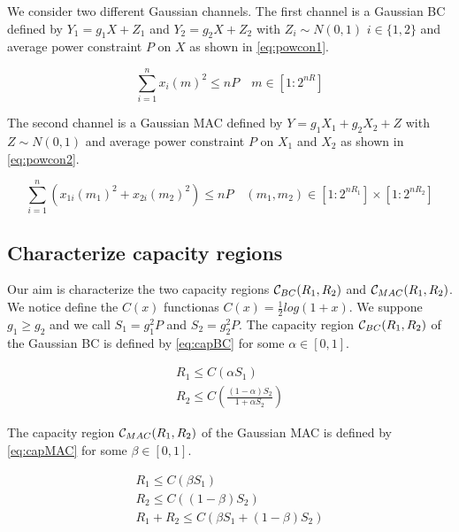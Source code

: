 
We consider two different Gaussian channels. The first channel is a Gaussian BC defined by $Y_1 = g_1 X + Z_1$  and $Y_2 = g_2 X + Z_2$ with $Z_i \sim N(0,1)$ $i \in \{1,2\}$ and average power constraint $P$ on $X$ as shown in \eqref{eq:powcon1}.

\begin{equation}
	\sum_{i=1}^n x_i(m)^2 \leq nP \quad m \in [1:2^{nR}]
	\label{eq:powcon1}
\end{equation}

The second channel is a Gaussian MAC defined by $Y = g_1 X_1 + g_2 X_2 + Z$ with $Z \sim N(0,1)$ and average power constraint $P$ on $X_1$ and $X_2$ as shown in \eqref{eq:powcon2}.

\begin{equation}
	\sum_{i=1}^n \left( x_{1i}(m_1)^2 + x_{2i}(m_2)^2 \right) \leq nP \quad (m_1,m_2) \in [1:2^{nR_1}] \times [1:2^{nR_2}]
	\label{eq:powcon2}
\end{equation}

\subsection{Characterize capacity regions}

Our aim is characterize the two capacity regions $\mathcal{C}_{BC}(R_1, R_2)$ and $\mathcal{C}_{MAC}(R_1, R_2)$. We notice define the $C(x)$ functionas $C(x)=\frac{1}{2}log(1+x)$. We suppone $g_1 \geq g_2$ and we call $S_1=g_1^2P$ and $S_2=g_2^2P$. The capacity region $\mathcal{C}_{BC}(R_1, R_2)$ of the Gaussian BC is defined by \eqref{eq:capBC} for some $\alpha \in [0,1]$.

\begin{equation}
	\begin{gathered}
		R_1 \leq C(\alpha S_1) \\
		R_2 \leq C\left(\frac{(1-\alpha)S_2}{1+\alpha S_2}\right)
	\end{gathered}
	\label{eq:capBC}
\end{equation}

The capacity region $\mathcal{C}_{MAC}(R_1, R_2)$ of the Gaussian MAC is defined by \eqref{eq:capMAC} for some $\beta \in [0,1]$.

\begin{equation}
	\begin{gathered}
		R_1 \leq C(\beta S_1) \\
		R_2 \leq C((1-\beta) S_2) \\
		R_1 + R_2 \leq C(\beta S_1 + (1-\beta)S_2)
	\end{gathered}
	\label{eq:capMAC}
\end{equation}

